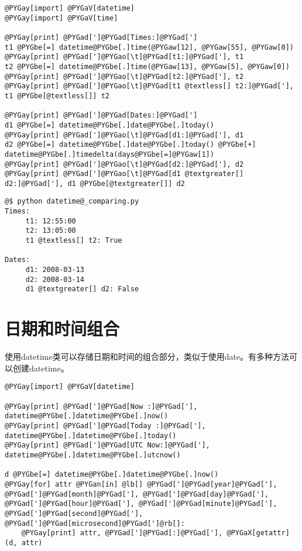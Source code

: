 \documentclass[a4paper,10pt,english]{manual}
\begin{document}
\begin{Verbatim}[commandchars=@\[\]]
@PYGay[import] @PYGaV[datetime]
@PYGay[import] @PYGaV[time]

@PYGay[print] @PYGad[']@PYGad[Times:]@PYGad[']
t1 @PYGbe[=] datetime@PYGbe[.]time(@PYGaw[12], @PYGaw[55], @PYGaw[0])
@PYGay[print] @PYGad[']@PYGao[\t]@PYGad[t1:]@PYGad['], t1
t2 @PYGbe[=] datetime@PYGbe[.]time(@PYGaw[13], @PYGaw[5], @PYGaw[0])
@PYGay[print] @PYGad[']@PYGao[\t]@PYGad[t2:]@PYGad['], t2
@PYGay[print] @PYGad[']@PYGao[\t]@PYGad[t1 @textless[] t2:]@PYGad['], t1 @PYGbe[@textless[]] t2

@PYGay[print] @PYGad[']@PYGad[Dates:]@PYGad[']
d1 @PYGbe[=] datetime@PYGbe[.]date@PYGbe[.]today()
@PYGay[print] @PYGad[']@PYGao[\t]@PYGad[d1:]@PYGad['], d1
d2 @PYGbe[=] datetime@PYGbe[.]date@PYGbe[.]today() @PYGbe[+] datetime@PYGbe[.]timedelta(days@PYGbe[=]@PYGaw[1])
@PYGay[print] @PYGad[']@PYGao[\t]@PYGad[d2:]@PYGad['], d2
@PYGay[print] @PYGad[']@PYGao[\t]@PYGad[d1 @textgreater[] d2:]@PYGad['], d1 @PYGbe[@textgreater[]] d2
\end{Verbatim}

\begin{Verbatim}[commandchars=@\[\]]
@$ python datetime@_comparing.py
Times:
     t1: 12:55:00
     t2: 13:05:00
     t1 @textless[] t2: True

Dates:
     d1: 2008-03-13
     d2: 2008-03-14
     d1 @textgreater[] d2: False
\end{Verbatim}


\section{日期和时间组合}

使用datetime类可以存储日期和时间的组合部分，类似于使用date。有多种方法可以创建datetime。

\begin{Verbatim}[commandchars=@\[\]]
@PYGay[import] @PYGaV[datetime]

@PYGay[print] @PYGad[']@PYGad[Now :]@PYGad['], datetime@PYGbe[.]datetime@PYGbe[.]now()
@PYGay[print] @PYGad[']@PYGad[Today :]@PYGad['], datetime@PYGbe[.]datetime@PYGbe[.]today()
@PYGay[print] @PYGad[']@PYGad[UTC Now:]@PYGad['], datetime@PYGbe[.]datetime@PYGbe[.]utcnow()

d @PYGbe[=] datetime@PYGbe[.]datetime@PYGbe[.]now()
@PYGay[for] attr @PYGan[in] @lb[] @PYGad[']@PYGad[year]@PYGad['], @PYGad[']@PYGad[month]@PYGad['], @PYGad[']@PYGad[day]@PYGad['], @PYGad[']@PYGad[hour]@PYGad['], @PYGad[']@PYGad[minute]@PYGad['], @PYGad[']@PYGad[second]@PYGad['], @PYGad[']@PYGad[microsecond]@PYGad[']@rb[]:
    @PYGay[print] attr, @PYGad[']@PYGad[:]@PYGad['], @PYGaX[getattr](d, attr)
\end{Verbatim}
\end{document}

